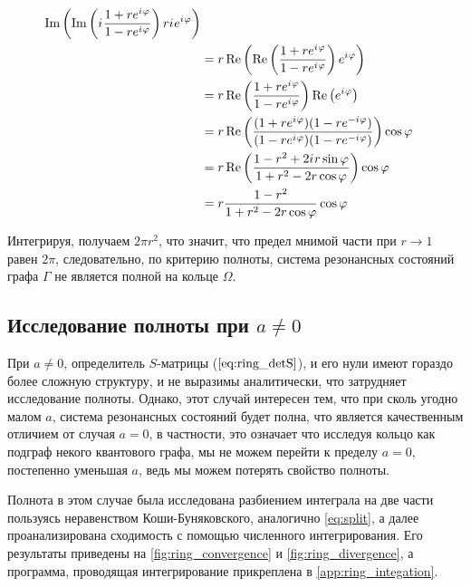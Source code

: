 \begin{align*}
   \operatorname{Im} \left(  \operatorname{Im} \left( {i\mkern1mu} \frac{1 + r e^{{i\mkern1mu} \varphi}}{1 - r e^{{i\mkern1mu} \varphi}} \right) r {i\mkern1mu} e^{{i\mkern1mu} \varphi} \right)
\\ &= r \operatorname{Re} \left(  \operatorname{Re} \left( \frac{1 + r e^{{i\mkern1mu} \varphi}}{1 - r e^{{i\mkern1mu} \varphi}} \right) e^{{i\mkern1mu} \varphi} \right)
\\ &= r \operatorname{Re} \left( \frac{1 + r e^{{i\mkern1mu} \varphi}}{1 - r e^{{i\mkern1mu} \varphi}} \right) \operatorname{Re} \left(   e^{{i\mkern1mu} \varphi} \right)
\\ &= r \operatorname{Re} \left( \frac{(1 + r e^{{i\mkern1mu} \varphi}) (1 - r e^{-{i\mkern1mu} \varphi}) }{(1 - r e^{{i\mkern1mu} \varphi}) (1 - r e^{-{i\mkern1mu} \varphi})} \right) \cos \varphi
\\ &= r \operatorname{Re} \left( \frac{1 - r^2 + 2 {i\mkern1mu} r \sin \varphi}{1 + r^2 - 2 r \cos \varphi} \right) \cos \varphi
\\ &= r \frac{1 - r^2}{1 + r^2 - 2 r \cos \varphi} \cos \varphi 
\end{align*}

Интегрируя, получаем $2 \pi r^2$, что значит, что предел мнимой части при $r \to 1$ равен $2 \pi$, следовательно, по критерию полноты, система резонансных состояний графа $\Gamma$ не является полной на кольце $\Omega$.


\subsection{Исследование полноты при $a \ne 0$}\label{sec:ring_compl_proof}

При $a \ne 0$, определитель $S$-матрицы ($\ref{eq:ring_detS}$), и его нули имеют гораздо более сложную структуру, и не выразимы аналитически, что затрудняет исследование полноты. Однако, этот случай интересен тем, что при сколь угодно малом $a$, система резонансных состояний будет полна, что является качественным отличием от случая $a = 0$, в частности, это означает что исследуя кольцо как подграф некого квантового графа, мы не можем перейти к пределу $a=0$, постепенно уменьшая $a$, ведь мы можем потерять свойство полноты.

Полнота в этом случае была исследована разбиением интеграла на две части пользуясь неравенством Коши-Буняковского, аналогично \ref{eq:split}, а далее проанализирована сходимость с помощью численного интегрирования. Его результаты приведены на \autoref{fig:ring_convergence} и \autoref{fig:ring_divergence}, а программа, проводящая интегрирование прикреплена в \autoref{app:ring_integation}.


